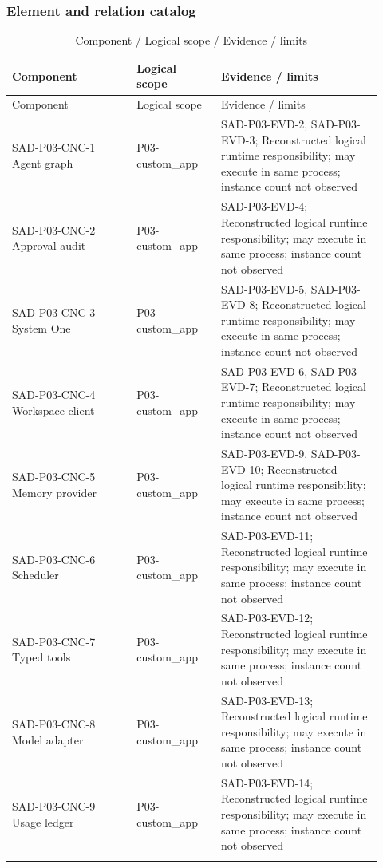\documentclass[10pt,letterpaper]{article}
\begin{document}
\subsubsection{Element and relation catalog}
\begin{longtable}{@{}>{\raggedright\arraybackslash}p{0.31\linewidth}>{\raggedright\arraybackslash}p{0.21\linewidth}>{\raggedright\arraybackslash}p{0.4\linewidth}@{}}
\caption{Component / Logical scope / Evidence / limits}\\
\toprule Component & Logical scope & Evidence / limits\\\midrule\endfirsthead
\toprule Component & Logical scope & Evidence / limits\\\midrule\endhead
SAD-P03-CNC-1 Agent graph & P03-custom\_app & SAD-P03-EVD-2, SAD-P03-EVD-3; Reconstructed logical runtime responsibility; may execute in same process; instance count not observed\\\addlinespace
SAD-P03-CNC-2 Approval audit & P03-custom\_app & SAD-P03-EVD-4; Reconstructed logical runtime responsibility; may execute in same process; instance count not observed\\\addlinespace
SAD-P03-CNC-3 System One & P03-custom\_app & SAD-P03-EVD-5, SAD-P03-EVD-8; Reconstructed logical runtime responsibility; may execute in same process; instance count not observed\\\addlinespace
SAD-P03-CNC-4 Workspace client & P03-custom\_app & SAD-P03-EVD-6, SAD-P03-EVD-7; Reconstructed logical runtime responsibility; may execute in same process; instance count not observed\\\addlinespace
SAD-P03-CNC-5 Memory provider & P03-custom\_app & SAD-P03-EVD-9, SAD-P03-EVD-10; Reconstructed logical runtime responsibility; may execute in same process; instance count not observed\\\addlinespace
SAD-P03-CNC-6 Scheduler & P03-custom\_app & SAD-P03-EVD-11; Reconstructed logical runtime responsibility; may execute in same process; instance count not observed\\\addlinespace
SAD-P03-CNC-7 Typed tools & P03-custom\_app & SAD-P03-EVD-12; Reconstructed logical runtime responsibility; may execute in same process; instance count not observed\\\addlinespace
SAD-P03-CNC-8 Model adapter & P03-custom\_app & SAD-P03-EVD-13; Reconstructed logical runtime responsibility; may execute in same process; instance count not observed\\\addlinespace
SAD-P03-CNC-9 Usage ledger & P03-custom\_app & SAD-P03-EVD-14; Reconstructed logical runtime responsibility; may execute in same process; instance count not observed\\\addlinespace

\end{longtable}
\end{document}
